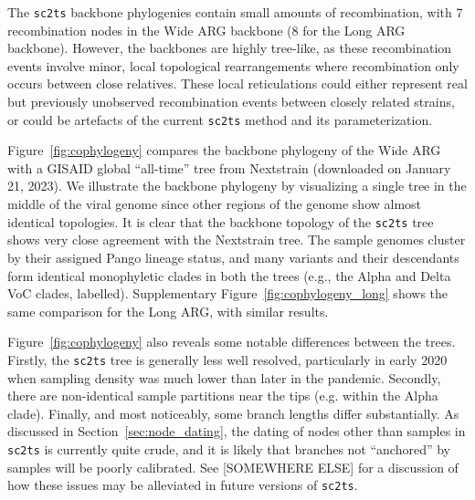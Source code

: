 \documentclass{article}
\begin{document}
The \texttt{sc2ts} backbone phylogenies contain small amounts of recombination,
with 7 recombination nodes in the Wide ARG backbone (8 for the Long ARG
backbone). However, the backbones are highly tree-like, as these
recombination events involve minor, local topological rearrangements
where recombination only occurs between close relatives.
These local reticulations could either represent
real but previously unobserved recombination events between closely related strains,
or could be artefacts of the current \texttt{sc2ts} method and its parameterization.

Figure~\ref{fig:cophylogeny} compares the backbone phylogeny of the Wide ARG with
a GISAID global ``all-time'' tree from Nextstrain
(downloaded on January 21, 2023).
We illustrate the backbone phylogeny by visualizing
a single tree in the middle of the viral genome
since other regions of the
genome show almost identical topologies.
It is clear that the backbone topology of the \texttt{sc2ts} tree shows very close
agreement with the Nextstrain tree. The sample genomes cluster by their
assigned Pango lineage status, and many variants and their descendants form
identical monophyletic clades in both the trees (e.g., the Alpha and Delta VoC
clades, labelled).
Supplementary Figure~\ref{fig:cophylogeny_long} shows the same comparison for the Long ARG, with similar results.

Figure~\ref{fig:cophylogeny} also reveals some notable differences between the
trees. Firstly, the \texttt{sc2ts} tree is generally less well resolved,
particularly in early 2020 when sampling density was much lower than
later in the pandemic.
Secondly, there are non-identical sample partitions
near the tips (e.g. within the Alpha clade).
Finally, and most noticeably, some branch lengths differ substantially.
As discussed in Section~\ref{sec:node_dating}, the dating of nodes
other than samples in \texttt{sc2ts} is currently quite crude, and
it is likely that branches not ``anchored'' by samples will be
poorly calibrated. See [SOMEWHERE ELSE] for a discussion of how
these issues may be alleviated in future versions of \texttt{sc2ts}.
\end{document}
